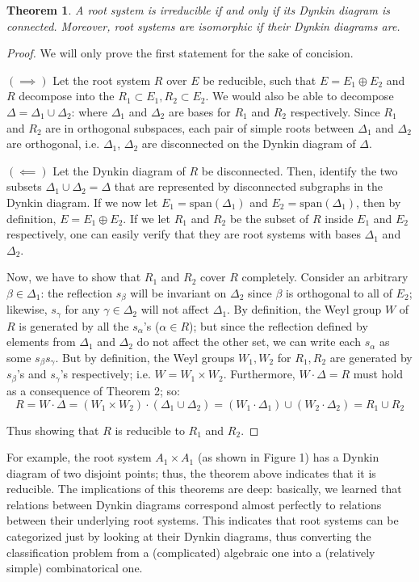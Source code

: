 \documentclass{article}
\newtheorem{theorem}{Theorem}
\theoremstyle{definition}
\begin{document}
\begin{theorem}
A root system is irreducible if and only if its Dynkin diagram is connected. Moreover, root systems are isomorphic if their Dynkin diagrams are. 
\end{theorem}
\begin{proof}
We will only prove the first statement for the sake of concision. 

$(\implies)$ Let the root system $R$ over $E$ be reducible, such that $E=E_1\oplus E_2$ and $R$ decompose into the $R_1\subset E_1, R_2\subset E_2$. We would also be able to decompose $\Delta=\Delta_1\cup\Delta_2$: where $\Delta_1$ and $\Delta_2$ are bases for $R_1$ and $R_2$ respectively. Since $R_1$ and $R_2$ are in orthogonal subspaces, each pair of simple roots between $\Delta_1$ and $\Delta_2$ are orthogonal, i.e. $\Delta_1$, $\Delta_2$ are disconnected on the Dynkin diagram of $\Delta$. 

$(\impliedby)$ Let the Dynkin diagram of $R$ be disconnected. Then, identify the two subsets $\Delta_1\cup\Delta_2=\Delta$ that are represented by disconnected subgraphs in the Dynkin diagram. If we now let $E_1=\mbox{span}(\Delta_1)$ and $E_2=\mbox{span}(\Delta_1)$, then by definition, $E=E_1 \oplus E_2$. If we let $R_1$ and $R_2$ be the subset of $R$ inside $E_1$ and $E_2$ respectively, one can easily verify that they are root systems with bases $\Delta_1$ and $\Delta_2$. 

Now, we have to show that $R_1$ and $R_2$ cover $R$ completely. Consider an arbitrary $\beta\in\Delta_1$: the reflection $s_\beta$ will be invariant on $\Delta_2$ since $\beta$ is orthogonal to all of $E_2$; likewise, $s_{\gamma}$ for any $\gamma\in\Delta_2$ will not affect $\Delta_1$. By definition, the Weyl group $W$ of $R$ is generated by all the $s_\alpha$'s ($\alpha\in R$); but since the reflection defined by elements from $\Delta_1$ and $\Delta_2$ do not affect the other set, we can write each $s_\alpha$ as some $s_\beta s_\gamma$. But by definition, the Weyl groups $W_1,W_2$ for $R_1,R_2$ are generated by $s_\beta$'s and $s_\gamma$'s respectively; i.e. $W=W_1\times W_2$. Furthermore, $W\cdot\Delta= R$ must hold as a consequence of Theorem 2; so: 
$$R=W\cdot \Delta = (W_1\times W_2)\cdot (\Delta_1 \cup \Delta_2)=(W_1\cdot\Delta_1)\cup(W_2\cdot\Delta_2)=R_1\cup R_2$$

Thus showing that $R$ is reducible to $R_1$ and $R_2$. 
\end{proof}
For example, the root system $A_1\times A_1$ (as shown in Figure 1) has a Dynkin diagram of two disjoint points; thus, the theorem above indicates that it is reducible. The implications of this theorems are deep: basically, we learned that relations between Dynkin diagrams correspond almost perfectly to relations between their underlying root systems. This indicates that root systems can be categorized just by looking at their Dynkin diagrams, thus converting the classification problem from a (complicated) algebraic one into a (relatively simple) combinatorical one. 
\end{document}
